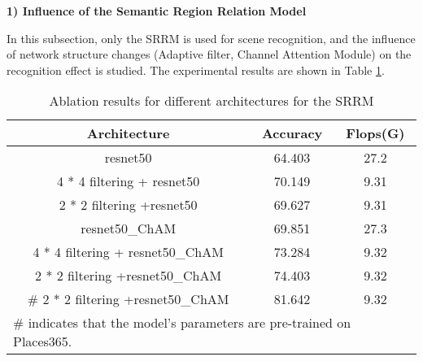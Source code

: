 \documentclass[conference]{IEEEtran}
\begin{document}
\textbf{1) Influence of the Semantic Region Relation Model}

In this subsection, only the SRRM is used for scene recognition, and the influence of network structure changes (Adaptive filter, Channel Attention Module) on the recognition effect is studied. The experimental results are shown in Table \ref{tab1}.

\begin{table}[htbp]
    \centering
    \caption{Ablation results for different architectures for the SRRM}
    \begin{tabular}{ccc}
        \hline
        \textbf{Architecture} & \textbf{Accuracy} & \textbf{Flops(G)} \\ \hline
        resnet50 & 64.403 & 27.2  \\ 
        4 * 4 filtering + resnet50 & 70.149 & 9.31  \\ 
        2 * 2 filtering +resnet50 & 69.627 & 9.31  \\ 
        resnet50\_ChAM & 69.851 & 27.3  \\ 
        4 * 4 filtering + resnet50\_ChAM & 73.284 & 9.32  \\ 
        2 * 2 filtering +resnet50\_ChAM & 74.403 & 9.32  \\ 
        \# 2 * 2 filtering +resnet50\_ChAM & 81.642 & 9.32  \\ \hline
        \multicolumn{3}{l}{\# indicates that the model's parameters are pre-trained on Places365.}
    \end{tabular}
    \label{tab1}
\end{table}
\end{document}
